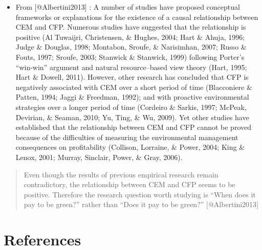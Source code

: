 \documentclass[]{article}
\providecommand{\tightlist}{%
  \setlength{\itemsep}{0pt}\setlength{\parskip}{0pt}}
\begin{document}
\begin{itemize}
\tightlist
\item
  From {[}@Albertini2013{]} : A number of studies have proposed
  conceptual frameworks or explanations for the existence of a causal
  relationship between CEM and CFP. Numerous studies have suggested that
  the relationship is positive (Al Tuwaijri, Christensen, \& Hughes,
  2004; Hart \& Ahuja, 1996; Judge \& Douglas, 1998; Montabon, Sroufe,
  \& Narisimhan, 2007; Russo \& Fouts, 1997; Sroufe, 2003; Stanwick \&
  Stanwick, 1999) following Porter's ``win-win'' argument and natural
  resource--based view theory (Hart, 1995; Hart \& Dowell, 2011).
  However, other research has concluded that CFP is negatively
  associated with CEM over a short period of time (Blacconiere \&
  Patten, 1994; Jaggi \& Freedman, 1992); and with proactive
  environmental strategies over a longer period of time (Cordeiro \&
  Sarkis, 1997; McPeak, Devirian, \& Seaman, 2010; Yu, Ting, \& Wu,
  2009). Yet other studies have established that the relationship
  between CEM and CFP cannot be proved because of the difficulties of
  measuring the environmental management consequences on profitability
  (Collison, Lorraine, \& Power, 2004; King \& Lenox, 2001; Murray,
  Sinclair, Power, \& Gray, 2006).
\end{itemize}

\begin{quote}
Even though the results of previous empirical research remain
contradictory, the relationship between CEM and CFP seems to be
positive. Therefore the research question worth studying is ``When does
it pay to be green?'' rather than ``Does it pay to be green?''
{[}@Albertini2013{]}
\end{quote}

\section{References}\label{references}
\end{document}
